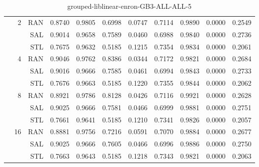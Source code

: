 \begin{center}
\begin{table}[htbp]
\begin{center}
\begin{tabular}{ | r | r | r | r | r | r | r | r | r | r | r |}
 & \multirow{3}{*}{2} & RAN & 0.8740 & 0.9805 & 0.6998 & 0.0747 & 0.7114 & 0.9890 & 0.0000 & 0.2549\\ \cline{3-11}
 &   & SAL & 0.9014 & 0.9658 & 0.7589 & 0.0460 & 0.6988 & 0.9840 & 0.0000 & 0.2736\\ \cline{3-11}
 &   & STL & 0.7675 & 0.9632 & 0.5185 & 0.1215 & 0.7354 & 0.9834 & 0.0000 & 0.2061\\ \cline{2-11}
 & \multirow{3}{*}{4} & RAN & 0.9046 & 0.9762 & 0.8386 & 0.0344 & 0.7172 & 0.9821 & 0.0000 & 0.2684\\ \cline{3-11}
 &   & SAL & 0.9016 & 0.9666 & 0.7585 & 0.0461 & 0.6994 & 0.9843 & 0.0000 & 0.2733\\ \cline{3-11}
 &   & STL & 0.7676 & 0.9663 & 0.5185 & 0.1220 & 0.7355 & 0.9844 & 0.0000 & 0.2062\\ \cline{2-11}
 & \multirow{3}{*}{8} & RAN & 0.8921 & 0.9786 & 0.8128 & 0.0426 & 0.7116 & 0.9921 & 0.0000 & 0.2628\\ \cline{3-11}
 &   & SAL & 0.9025 & 0.9666 & 0.7581 & 0.0466 & 0.6999 & 0.9881 & 0.0000 & 0.2751\\ \cline{3-11}
 &   & STL & 0.7661 & 0.9641 & 0.5185 & 0.1210 & 0.7341 & 0.9826 & 0.0000 & 0.2057\\ \cline{2-11}
 & \multirow{3}{*}{16} & RAN & 0.8881 & 0.9756 & 0.7216 & 0.0591 & 0.7070 & 0.9884 & 0.0000 & 0.2677\\ \cline{3-11}
 &   & SAL & 0.9025 & 0.9666 & 0.7605 & 0.0466 & 0.6996 & 0.9886 & 0.0000 & 0.2750\\ \cline{3-11}
 &   & STL & 0.7663 & 0.9643 & 0.5185 & 0.1218 & 0.7343 & 0.9821 & 0.0000 & 0.2063\\ \cline{2-11}
\hline
\end{tabular}
\caption{grouped-liblinear-enron-GB3-ALL-ALL-5}
\end{center}
 \end{table}
\end{center}

